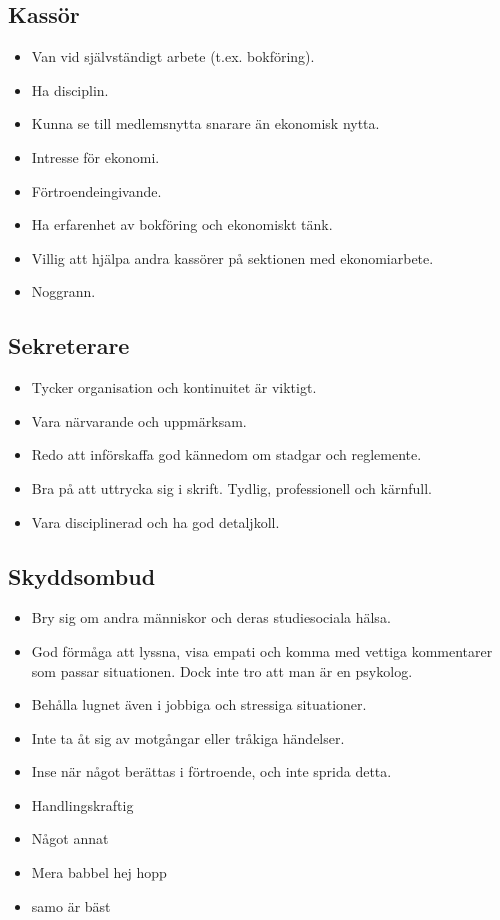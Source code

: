 \documentclass[a4paper]{article}
\begin{document}
\subsection*{Kassör}
\begin{itemize}
\item Van vid självständigt arbete (t.ex. bokföring).
\item Ha disciplin.
\item Kunna se till medlemsnytta snarare än ekonomisk nytta.
\item Intresse för ekonomi.
\item Förtroendeingivande.
\item Ha erfarenhet av bokföring och ekonomiskt tänk.
\item Villig att hjälpa andra kassörer på sektionen med ekonomiarbete.
\item Noggrann.
\end{itemize}

\subsection*{Sekreterare}
\begin{itemize}
\item Tycker organisation och kontinuitet är viktigt.
\item Vara närvarande och uppmärksam.
\item Redo att införskaffa god kännedom om stadgar och reglemente.
\item Bra på att uttrycka sig i skrift. Tydlig, professionell och kärnfull.
\item Vara disciplinerad och ha god detaljkoll.
\end{itemize}

\subsection*{Skyddsombud}
\begin{itemize}
\item Bry sig om andra människor och deras studiesociala hälsa.
\item God förmåga att lyssna, visa empati och komma med vettiga kommentarer som passar situationen. Dock inte tro att man är en psykolog.
\item Behålla lugnet även i jobbiga och stressiga situationer. 
\item Inte ta åt sig av motgångar eller tråkiga händelser.
\item Inse när något berättas i förtroende, och inte sprida detta. 
\item Handlingskraftig
\item Något annat
\item Mera babbel hej hopp
\item samo är bäst
\end{itemize}
        
\end{document}
